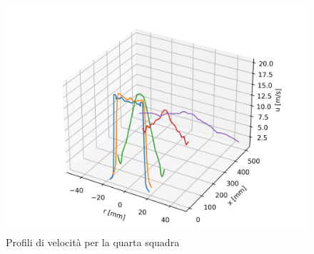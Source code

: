 \begin{figure}[H]
    \centering
    \includegraphics[width=.85\textwidth]{images/3/sq43d.png}
    \caption{Profili di velocità per la quarta squadra}
\end{figure}

